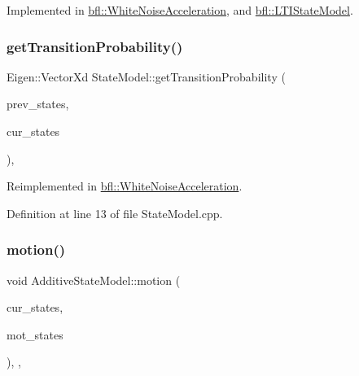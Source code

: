 Implemented in \mbox{\hyperlink{classbfl_1_1WhiteNoiseAcceleration_aa304ad7f628e84c06393ba3835d2bb2f}{bfl\+::\+White\+Noise\+Acceleration}}, and \mbox{\hyperlink{classbfl_1_1LTIStateModel_a65d486fe684ebbd4970391809ccf2bd9}{bfl\+::\+L\+T\+I\+State\+Model}}.

\mbox{\label{classbfl_1_1StateModel_acb582cb7d41ec7b854ed1dbd8965b6fc}} 
\subsubsection{\texorpdfstring{get\+Transition\+Probability()}{getTransitionProbability()}}
{\footnotesize\ttfamily Eigen\+::\+Vector\+Xd State\+Model\+::get\+Transition\+Probability (\begin{DoxyParamCaption}\item[{const Eigen\+::\+Ref$<$ const Eigen\+::\+Matrix\+Xd $>$ \&}]{prev\+\_\+states,  }\item[{Eigen\+::\+Ref$<$ Eigen\+::\+Matrix\+Xd $>$}]{cur\+\_\+states }\end{DoxyParamCaption})\hspace{0.3cm}{\ttfamily [virtual]}, {\ttfamily [inherited]}}



Reimplemented in \mbox{\hyperlink{classbfl_1_1WhiteNoiseAcceleration_a10d81273e59d14f7d7ce794533c122a8}{bfl\+::\+White\+Noise\+Acceleration}}.



Definition at line 13 of file State\+Model.\+cpp.

\mbox{\label{classbfl_1_1AdditiveStateModel_a9f145bf8c592fc0092d84421f26dbb8b}} 
\subsubsection{\texorpdfstring{motion()}{motion()}}
{\footnotesize\ttfamily void Additive\+State\+Model\+::motion (\begin{DoxyParamCaption}\item[{const Eigen\+::\+Ref$<$ const Eigen\+::\+Matrix\+Xd $>$ \&}]{cur\+\_\+states,  }\item[{Eigen\+::\+Ref$<$ Eigen\+::\+Matrix\+Xd $>$}]{mot\+\_\+states }\end{DoxyParamCaption})\hspace{0.3cm}{\ttfamily [override]}, {\ttfamily [virtual]}, {\ttfamily [inherited]}}



